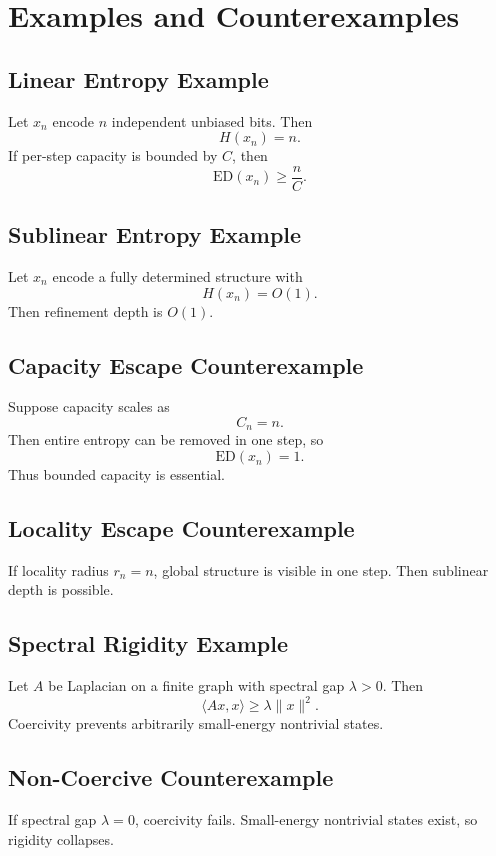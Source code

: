 \chapter{Examples and Counterexamples}

\section{Linear Entropy Example}

\begin{example}
Let $x_n$ encode $n$ independent unbiased bits.
Then
\[
H(x_n)=n.
\]
If per-step capacity is bounded by $C$, then
\[
\mathrm{ED}(x_n)\ge \frac{n}{C}.
\]
\end{example}

\section{Sublinear Entropy Example}

\begin{example}
Let $x_n$ encode a fully determined structure with
\[
H(x_n)=O(1).
\]
Then refinement depth is $O(1)$.
\end{example}

\section{Capacity Escape Counterexample}

\begin{counterexample}
Suppose capacity scales as
\[
C_n = n.
\]
Then entire entropy can be removed in one step,
so
\[
\mathrm{ED}(x_n)=1.
\]
Thus bounded capacity is essential.
\end{counterexample}

\section{Locality Escape Counterexample}

\begin{counterexample}
If locality radius $r_n=n$, global structure is visible in one step.
Then sublinear depth is possible.
\end{counterexample}

\section{Spectral Rigidity Example}

\begin{example}
Let $A$ be Laplacian on a finite graph with spectral gap $\lambda>0$.
Then
\[
\langle Ax,x\rangle \ge \lambda \|x\|^2.
\]
Coercivity prevents arbitrarily small-energy nontrivial states.
\end{example}

\section{Non-Coercive Counterexample}

\begin{counterexample}
If spectral gap $\lambda=0$, coercivity fails.
Small-energy nontrivial states exist,
so rigidity collapses.
\end{counterexample}
